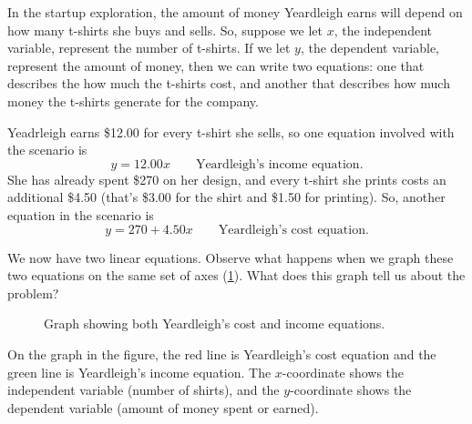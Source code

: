 In the startup exploration, the amount of money Yeardleigh earns will depend on how many t-shirts she buys and sells. So, suppose we let $x$, the independent variable, represent the number of t-shirts. If we let $y$, the dependent variable, represent the amount of money, then we can write two equations: one that describes the how much the t-shirts cost, and another that describes how much money the t-shirts generate for the company.

Yeadrleigh earns \$12.00 for every t-shirt she sells, so one equation involved with the scenario is \[y = 12.00x \qquad\text{Yeardleigh's income equation}.\] She has already spent \$270 on her design, and every t-shirt she prints costs an additional \$4.50 (that's \$3.00 for the shirt and \$1.50 for printing). So, another equation in the scenario is \[y = 270 + 4.50x\qquad\text{Yeardleigh's cost equation}.\]

We now have two linear equations. Observe what happens when we graph these two equations on the same set of axes (\cref{fig:tshirts}). What does this graph tell us about the problem?

\begin{figure}[!htbp]
\centering
{}
\caption{Graph showing both Yeardleigh's cost and income equations.}
\label{fig:tshirts}
\end{figure}

On the graph in the figure, the red line is Yeardleigh's cost equation and the green line is Yeardleigh's income equation. The $x$-coordinate shows the independent variable (number of shirts), and the $y$-coordinate shows the dependent variable (amount of money spent or earned).


